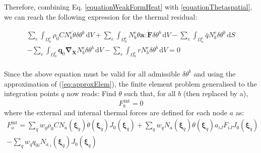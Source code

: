 \documentclass[oneside,11pt,times]{book}
\begin{document}
Therefore, combining Eq. \eqref{equationWeakFormHeat} with \eqref{equationThetaspatial}, we can reach the following expression for the thermal residual:


%
\begin{equation} \label{equationGlobalWeakFormHeat}
 \begin{split}
 \sum_e \int_{\Omega_{0}^e} \rho_0C N^e_b\dot{\theta}\delta\theta^b\, \text{d} V+ \sum_e\int_{\Omega_{0}^e} N^e_b\theta\bm{a}:\dot{\bm{F}}\delta\theta^b\, \text{d} V  -\sum_e \int_{\Omega_{n}^e} \bar{q} N^e_b\delta\theta^b \, \text{d} S\\- \sum_e \int_{\Omega_{0}^e}\bm{q}_0\bm{\nabla_{X}}N^e_b\delta\theta^b\, \text{d} V- \sum_e\int_{\Omega_{0}^e}rN^e_b\delta\theta^b\, \text{d} V=0
 \end{split}
\end{equation}
%
\\
Since the above equation must be valid for all admissible $ \delta\theta^b$ and using the approximation of (\ref{eq:approxElem}), the finite element problem generalised to the integration points $q$ now reads: Find ${\theta}$ such that, for all $b$ (then replaced by a),
%
\begin{equation} \label{equationResTheta}
{F}_{b}^{\,\text{int}} = 0
\end{equation}
%
where the external and internal thermal forces are defined for each node $a$ as:\\

\begin{equation}
\begin{split} 
{F}^{\text{int}}_a=\sum_q w_q\rho_0C N_a(\bm{\xi}_q)\dot{\theta}(\bm{\xi}_q)J_0(\bm{\xi}_q)+\sum_q w_q N_a(\bm{\xi}_q)\theta(\bm{\xi}_q) a_{iJ}\dot{F}_{iJ}J_0(\bm{\xi}_q) \\-\sum_q w_q q_{0i} N_{a_{,i}}(\bm{\xi}_q)J_0(\bm{\xi}_q)
\end{split}
\label{equationFintElemTheta}
\end{equation}
\end{document}
